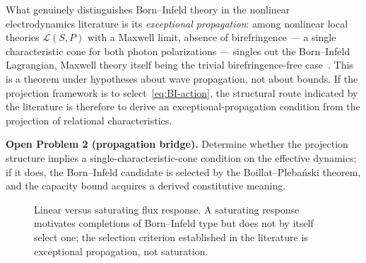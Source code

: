 \documentclass[epj]{svjour}
\begin{document}
    What genuinely distinguishes Born--Infeld theory in the nonlinear electrodynamics literature is
    its \emph{exceptional propagation}: among nonlinear local theories $\mathcal{L}(S, P)$ with a
    Maxwell limit, absence of birefringence --- a single characteristic cone for both photon
    polarizations --- singles out the Born--Infeld Lagrangian, Maxwell theory itself being the
    trivial birefringence-free case~\cite{Boillat1970,Plebanski1970}.
    This is a theorem under hypotheses about wave propagation, not about bounds.
    If the projection framework is to select~\eqref{eq:BI-action}, the structural route indicated by
    the literature is therefore to derive an exceptional-propagation condition from the projection
    of relational characteristics.

    \medskip
    \noindent\textbf{Open Problem 2 (propagation bridge).}
    Determine whether the projection structure implies a single-characteristic-cone condition on the
    effective dynamics; if it does, the Born--Infeld candidate is selected by the
    Boillat--Pleba\'nski theorem, and the capacity bound acquires a derived constitutive meaning.
    \medskip

    \begin{figure}[t]
      \centering
      \caption{
        Linear versus saturating flux response.
        A saturating response motivates completions of Born--Infeld type but does not by itself
        select one; the selection criterion established in the literature is exceptional
        propagation, not saturation.
      }
      \label{fig:bounded-vs-linear-flux}
    \end{figure}
\end{document}
